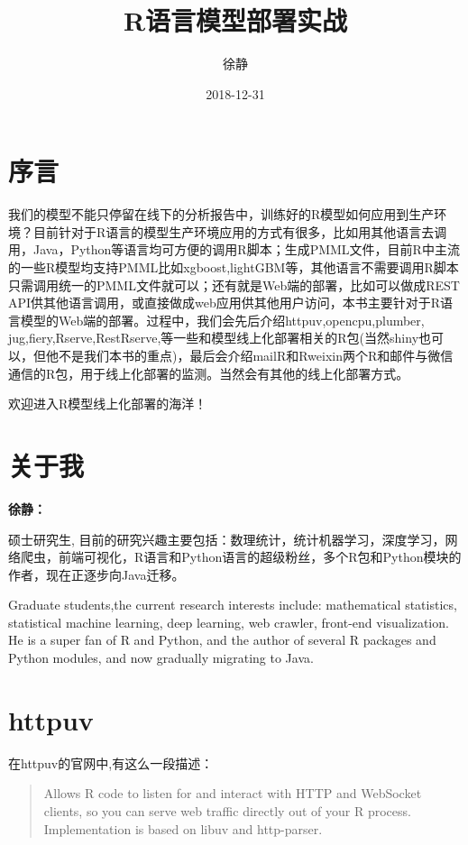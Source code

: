 \documentclass[]{book}
\title{R语言模型部署实战}
\author{徐静}
\date{2018-12-31}
\begin{document}
\maketitle

{
\setcounter{tocdepth}{1}
\tableofcontents
}
\chapter*{序言}

我们的模型不能只停留在线下的分析报告中，训练好的R模型如何应用到生产环境？目前针对于R语言的模型生产环境应用的方式有很多，比如用其他语言去调用，Java，Python等语言均可方便的调用R脚本；生成PMML文件，目前R中主流的一些R模型均支持PMML比如xgboost,lightGBM等，其他语言不需要调用R脚本只需调用统一的PMML文件就可以；还有就是Web端的部署，比如可以做成REST
API供其他语言调用，或直接做成web应用供其他用户访问，本书主要针对于R语言模型的Web端的部署。过程中，我们会先后介绍httpuv,opencpu,plumber,
jug,fiery,Rserve,RestRserve,等一些和模型线上化部署相关的R包(当然shiny也可以，但他不是我们本书的重点)，最后会介绍mailR和Rweixin两个R和邮件与微信通信的R包，用于线上化部署的监测。当然会有其他的线上化部署方式。

欢迎进入R模型线上化部署的海洋！

\chapter*{关于我}

\textbf{徐静：}

硕士研究生,
目前的研究兴趣主要包括：数理统计，统计机器学习，深度学习，网络爬虫，前端可视化，R语言和Python语言的超级粉丝，多个R包和Python模块的作者，现在正逐步向Java迁移。

Graduate students,the current research interests include: mathematical
statistics, statistical machine learning, deep learning, web crawler,
front-end visualization. He is a super fan of R and Python, and the
author of several R packages and Python modules, and now gradually
migrating to Java.

\chapter{httpuv}\label{httpuv}

在httpuv的官网中,有这么一段描述：

\begin{quote}
Allows R code to listen for and interact with HTTP and WebSocket
clients, so you can serve web traffic directly out of your R process.
Implementation is based on libuv and http-parser.
\end{quote}
\end{document}
